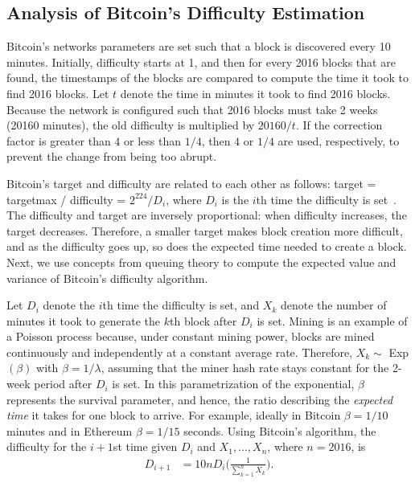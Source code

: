 \subsection{Analysis of Bitcoin's Difficulty Estimation}
 Bitcoin's networks parameters are set such that a block is discovered every 10 minutes. Initially, difficulty starts at 1, and then for every 2016 blocks that are found, the timestamps of the blocks are compared to compute the time it took to find 2016 blocks. Let $t$ denote the time in minutes it took to find 2016 blocks. Because the network is configured such that 2016 blocks must take 2 weeks (20160 minutes), the old difficulty is multiplied by $20160 / t$. If the correction factor is greater than $4$ or less than $1/4$, then $4$ or $1/4$ are used, respectively, to prevent the change from being too abrupt.
\par \noindent Bitcoin's target and difficulty are related to each other as follows: target = targetmax / difficulty = $2^{224}/{D_i}$, where $D_i$ is the $i$th time the difficulty is set~\cite{bitcoin:difficulty}. The difficulty and target are inversely proportional: when difficulty increases, the target decreases. Therefore, a smaller target makes block creation more difficult, and as the difficulty goes up, so does the expected time needed to create a block. Next, we use concepts from queuing theory to compute the expected value and variance of Bitcoin's difficulty algorithm.

Let $D_i$ denote the $i$th time the difficulty is set, and $X_k$ denote the number of minutes it took to generate the $k$th block after $D_i$ is set. 
Mining is an example of a Poisson process because, under constant
mining power, blocks are mined continuously and independently at a
constant average rate.  Therefore, $X_k \sim$ Exp$(\beta)$ with $\beta = 1/\lambda$, assuming that the miner hash rate stays constant for the 2-week period after $D_i$ is set. In this parametrization of the exponential, $\beta$ represents the survival parameter, and hence, the ratio describing the {\em expected time} it takes for one block to arrive. For example, ideally in Bitcoin $\beta=1/10$ minutes and in Ethereum $\beta=1/15$ seconds. Using Bitcoin's algorithm, the difficulty for the $i+1$st time given $D_i$ and $X_1, \dots, X_n$, where $n=2016$, is
\begin{align}
D_{i+1} &= 10nD_i \Bigg(\frac{1}{\sum_{k=1}^{n} X_k}\Bigg).\label{eq:original-bitcoin}
\end{align}

